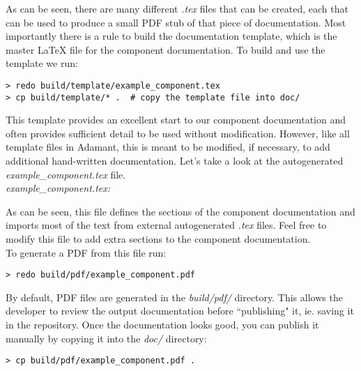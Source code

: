 As can be seen, there are many different \textit{.tex} files that can be created, each that can be used to produce a small PDF stub of that piece of documentation. Most importantly there is a rule to build the documentation template, which is the master \LaTeX{} file for the component documentation. To build and use the template we run:

\vspace{5mm} %
\begin{verbatim}
> redo build/template/example_component.tex
> cp build/template/* .  # copy the template file into doc/
\end{verbatim}
\vspace{5mm} %

This template provides an excellent start to our component documentation and often provides sufficient detail to be used without modification. However, like all template files in Adamant, this is meant to be modified, if necessary, to add additional hand-written documentation. Let's take a look at the autogenerated \textit{example\_component.tex} file. \\

\textit{example\_component.tex:}

As can be seen, this file defines the sections of the component documentation and imports most of the text from external autogenerated \textit{.tex} files. Feel free to modify this file to add extra sections to the component documentation. \\

To generate a PDF from this file run:

\vspace{5mm} %
\begin{verbatim}
> redo build/pdf/example_component.pdf
\end{verbatim}
\vspace{5mm} %

By default, PDF files are generated in the \textit{build/pdf/} directory. This allows the developer to review the output documentation before ``publishing" it, ie. saving it in the repository. Once the documentation looks good, you can publish it manually by copying it into the \textit{doc/} directory:

\vspace{5mm} %
\begin{verbatim}
> cp build/pdf/example_component.pdf .
\end{verbatim}
\vspace{5mm} %

